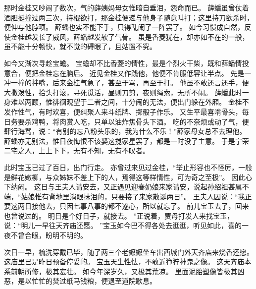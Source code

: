 那时金桂又吵闹了数次，气的薛姨妈母女惟暗自垂泪，怨命而已。
薛蟠虽曾仗着酒胆挺撞过两三次，持棍欲打，那金桂便递与他身子随意叫打；这里持刀欲杀时，便伸与他脖项。
薛蟠也实不能下手，只得乱闹了一阵罢了。
如今习惯成自然，反使金桂越发长了威风，薛蟠越发软了气骨。
虽是香菱犹在，却亦如不在的一般，虽不能十分畅快，就不觉的碍眼了，且姑置不究。
\par
如今又渐次寻趁宝蟾。
宝蟾却不比香菱的情性，最是个烈火干柴，既和薛蟠情投意合，便把金桂忘在脑后。
近见金桂又作践他，他便不肯服低容让半点。
先是一冲一撞的拌嘴，后来金桂气急了，甚至于骂，再至于打。
他虽不敢还言还手，便大撒泼性，拾头打滚，寻死觅活，昼则刀剪，夜则绳索，无所不闹。
薛蟠此时一身难以两顾，惟徘徊观望于二者之间，十分闹的无法，便出门躲在外厢。
金桂不发作性气，有时欢喜，便纠聚人来斗纸牌、掷骰子作乐。
又生平最喜啃骨头，每日务要杀鸡鸭，将肉赏人吃，只单以油炸焦骨头下酒。
吃的不奈烦或动了气，便肆行海骂，说：“有别的忘八粉头乐的，我为什么不乐！”薛家母女总不去理他。
薛蟠亦无别法，惟日夜悔恨不该娶这搅家星罢了，都是一时没了主意。
于是宁荣二宅之人，上上下下，无有不知，无有不叹者。
\par
此时宝玉已过了百日，出门行走。
亦曾过来见过金桂，“举止形容也不怪厉，一般是鲜花嫩柳，与众姊妹不差上下的人，焉得这等样情性，可为奇之至极”。
因此心下纳闷。
这日与王夫人请安去，又正遇见迎春奶娘来家请安，说起孙绍祖甚属不端，“姑娘惟有背地里淌眼抹泪的，只要接了来家散诞两日”。
王夫人因说：“我正要这两日接他去，只因七事八事的都不遂心，所以就忘了。
前儿宝玉去了，回来也曾说过的。
明日是个好日子，就接去。
”正说着，贾母打发人来找宝玉，说：“明儿一早往天齐庙还愿。
”宝玉如今巴不得各处去逛逛，听见如此，喜的一夜不曾合眼，盼明不明的。
\par
次日一早，梳洗穿戴已毕，随了两三个老嬷嬷坐车出西城门外天齐庙来烧香还愿。
这庙里已是昨日预备停妥的。
宝玉天生性怯，不敢近狰狞神鬼之像。
这天齐庙本系前朝所修，极其宏壮。
如今年深岁久，又极其荒凉。
里面泥胎塑像皆极其凶恶，是以忙忙的焚过纸马钱粮，便退至道院歇息。
